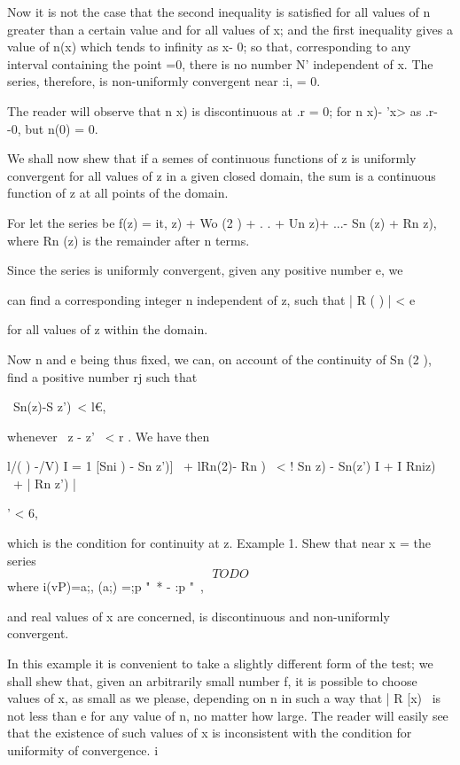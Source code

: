%
%

Now it is not the case that the second inequality is satisfied for all
values of n greater than a certain value and for all values of x; and
the first inequality gives a value of n(x) which tends to infinity as
x- 0; so that, corresponding to any interval containing the point =0,
there is no number N' independent of x. The series, therefore, is
non-uniformly convergent near :i, = 0.

The reader will observe that n x) is discontinuous at .r = 0; for n
x)- 'x> as .r- -0, but n(0) = 0.


We shall now shew that if a semes of continuous functions of z is
uniformly convergent for all values of z in a given closed domain, the
sum is a continuous function of z at all points of the domain.

For let the series be f(z) = it, z) + Wo (2 ) +  . . + Un z)+ ...- Sn
(z) + Rn z), where Rn (z) is the remainder after n terms.

Since the series is uniformly convergent, given any positive number e,
we

can find a corresponding integer n independent of z, such that | R ( )
| < e

for all values of z within the domain.

Now n and e being thus fixed, we can, on account of the continuity of
Sn (2 ), find a positive number rj such that

\ Sn(z)-S z')\ < l€,

whenever \ z - z' \ < r . We have then

l/( ) -/V) I = 1 [Sni ) - Sn z')] \ + lRn(2)- Rn ) \ < ! Sn z) -
Sn(z') I + I Rniz) \ + | Rn z') |

' < 6,

which is the condition for continuity at z. Example 1. Shew that near
x = the series
$$
TODO
$$
where i(vP)=a;, (a;) =;p "~* - :p "~,

and real values of x are concerned, is discontinuous and non-uniformly
convergent.

In this example it is convenient to take a slightly different form of
the test; we shall shew that, given an arbitrarily small number f, it
is possible to choose values of x, as small as we please, depending on
n in such a way that | R [x) \ is not less than e for any value of n,
no matter how large. The reader will easily see that the existence of
such values of x is inconsistent with the condition for uniformity of
convergence. i\

